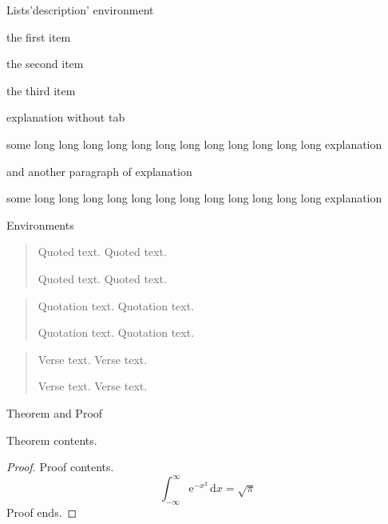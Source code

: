 \begin{frame}{Lists}{'description' environment}
\begin{description}
  \item[Alpha] the first item
  \item[Bravo] the second item
  \item[Charlie] the third item
  \item explanation without tab
  \item[Some Tab] some long long long long long long long long long long long long explanation \par
       and another paragraph of explanation
  \item[Some Long Long Tab] some long long long long long long long long long long long long explanation
\end{description}
\end{frame}

\begin{frame}{Environments}
\begin{quote}
Quoted text. \hfill\break Quoted text. 

Quoted text. \hfill\break Quoted text. 
\end{quote}
\begin{quotation}
Quotation text. \hfill\break Quotation text.

Quotation text. \hfill\break Quotation text.
\end{quotation}
\begin{verse}
Verse text. \hfill\break Verse text.

Verse text. \hfill\break Verse text.
\end{verse}
\end{frame}

\begin{frame}{Theorem and Proof}
\begin{theorem}
Theorem contents.
\end{theorem}
\begin{proof}
Proof contents.
\[
\int_{-\infty}^{\infty} {\mathrm{e}^{-x^2}\,\mathrm{d}x} = \sqrt{\pi}
\]
Proof ends.\qedhere
\end{proof}
\end{frame}

